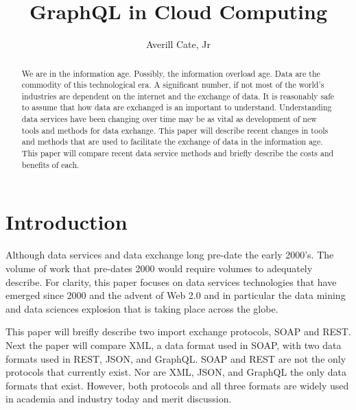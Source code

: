 \title{GraphQL in Cloud Computing}

\author{Averill Cate, Jr}

\renewcommand{\shortauthors}{A. Cate, Jr}

\begin{abstract}
We are in the information age.  Possibly, the information overload age.
Data are the commodity of this technological era.  A significant number, if not
most of the world's industries are dependent on the internet and the exchange
of data.  It is reasonably safe to assume that how data are exchanged is
an important to understand.  Understanding data services have been changing
over time may be as vital as development of new tools and methods for data
exchange.  This paper will describe recent changes in tools and methods that
are used to facilitate the exchange of data in the information age.  This paper
will compare recent data service methods and briefly describe the costs and benefits
of each.
\end{abstract}


\maketitle

\section{Introduction}
Although data services and data exchange long pre-date the early 2000's.  The
volume of work that pre-dates 2000 would require volumes to adequately describe.
For clarity, this paper focuses on data services technologies that have emerged
since 2000 and the advent of Web 2.0 and in particular the data mining and
data sciences explosion that is taking place across the globe.

This paper will breifly describe two import exchange protocols, SOAP and REST.  
Next the paper will compare XML, a data format used in SOAP, with two data
formats used in REST, JSON, and GraphQL.  SOAP and REST are not the only
protocols that currently exist.  Nor are XML, JSON, and GraphQL the only data
formats that exist.  However, both protocols and all three formats are widely
used in academia and industry today and merit discussion.

